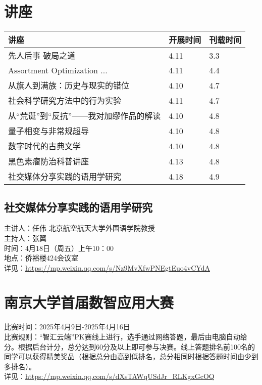\documentclass[letterpaper, 12pt]{article}
\begin{document}
\begin{multicols}{2}
\pagebreak

\section{讲座}
\begin{tabular}{|>{\centering\arraybackslash}m{}|m{}|m{}|}
    \hline
    讲座 & 开展时间 & 刊载时间\\
    \hline\hline
    先人后事 破局之道 & 4.11 & 3.3\\\hline
    Assortment Optimization ... & 4.11 & 4.4\\\hline
    从旗人到满族：历史与现实的错位 & 4.10 & 4.7\\\hline
    社会科学研究方法中的行为实验 & 4.11 & 4.7\\\hline
    从“荒诞”到“反抗”——我对加缪作品的解读 & 4.10 & 4.8\\\hline
    量子相变与非常规超导 & 4.10 & 4.8\\\hline
    数字时代的古典文学 & 4.10 & 4.8\\\hline
    黑色素瘤防治科普讲座 & 4.13 & 4.8\\\hline
    社交媒体分享实践的语用学研究 & 4.18 & 4.9\\\hline
\end{tabular}

\subsection{社交媒体分享实践的语用学研究}
主讲人：任伟 北京航空航天大学外国语学院教授
\\主持人：张翼
\\时间：4月18日（周五）上午10：00
\\地点：侨裕楼424会议室
\\详见：\url{https://mp.weixin.qq.com/s/Nz9MvXfwPNEgtEuo4vCYdA}

\section{南京大学首届数智应用大赛}
比赛时间：2025年4月9日-2025年4月16日
\\比赛规则：“智汇云端”PK赛线上进行，选手通过网络答题，最后由电脑自动给分。根据后台计分，总分达到60分及以上即可参与决赛。线上答题排名前100名的同学可以获得精美奖品（根据总分由高到低排名，总分相同时根据答题时间由少到多排名）。
\\详见：\url{https://mp.weixin.qq.com/s/dXsTAWqUSdJr_RLKgxGcOQ}


\end{multicols}
\end{document}
